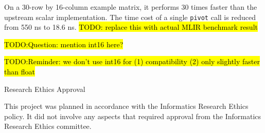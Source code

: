 \documentclass[logo,bsc,singlespacing,parskip]{infthesis}
\begin{document}
\begin{preliminary}
{On a 30-row by 16-column example matrix, it performs 30 times faster than the
upstream scalar implementation. The time cost of a single \texttt{pivot} call is
reduced from 550 ns to 18.6 ns. \hl{TODO: replace this with actual MLIR benchmark
result}

\hl{TODO:Question: mention int16 here?}

\hl{TODO:Reminder: we don't use int16 for (1) compatibility (2) only slightly faster than float}

}

\maketitle

\newenvironment{ethics}
   {\begin{frontenv}{Research Ethics Approval}{\LARGE}}
   {\end{frontenv}\newpage}

\begin{ethics}

This project was planned in accordance with the Informatics Research
Ethics policy. It did not involve any aspects that required approval
from the Informatics Research Ethics committee.

\standarddeclaration
\end{ethics}


\begin{acknowledgements}




\end{acknowledgements}


\tableofcontents
\end{preliminary}
\end{document}
